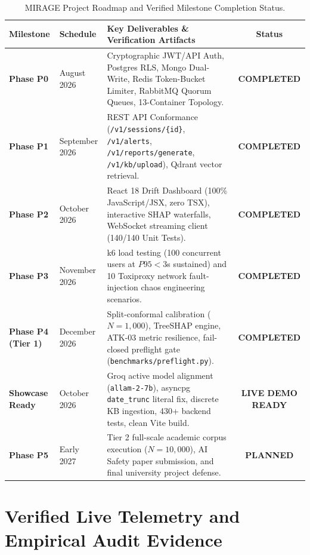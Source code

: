 \documentclass[11pt,a4paper]{article}
\begin{document}
\begin{table}[H]
\centering
\small
\renewcommand{\arraystretch}{1.25}
\begin{tabularx}{\linewidth}{p{2.6cm} p{2.8cm} X c}
\toprule
\textbf{Milestone} & \textbf{Schedule} & \textbf{Key Deliverables \& Verification Artifacts} & \textbf{Status} \\
\midrule
\textbf{Phase P0} & August 2026 & Cryptographic JWT/API Auth, Postgres RLS, Mongo Dual-Write, Redis Token-Bucket Limiter, RabbitMQ Quorum Queues, 13-Container Topology. & \textbf{COMPLETED} \\
\textbf{Phase P1} & September 2026 & REST API Conformance (\texttt{/v1/sessions/\{id\}}, \texttt{/v1/alerts}, \texttt{/v1/reports/generate}, \texttt{/v1/kb/upload}), Qdrant vector retrieval. & \textbf{COMPLETED} \\
\textbf{Phase P2} & October 2026 & React 18 Drift Dashboard (100\% JavaScript/JSX, zero TSX), interactive SHAP waterfalls, WebSocket streaming client (140/140 Unit Tests). & \textbf{COMPLETED} \\
\textbf{Phase P3} & November 2026 & k6 load testing (100 concurrent users at $P95 < 3$s sustained) and 10 Toxiproxy network fault-injection chaos engineering scenarios. & \textbf{COMPLETED} \\
\textbf{Phase P4 (Tier 1)} & December 2026 & Split-conformal calibration ($N=1,000$), TreeSHAP engine, ATK-03 metric resilience, fail-closed preflight gate (\texttt{benchmarks/preflight.py}). & \textbf{COMPLETED} \\
\textbf{Showcase Ready} & October 2026 & Groq active model alignment (\texttt{allam-2-7b}), asyncpg \texttt{date\_trunc} literal fix, discrete KB ingestion, 430+ backend tests, clean Vite build. & \textbf{LIVE DEMO READY} \\
\textbf{Phase P5} & Early 2027 & Tier 2 full-scale academic corpus execution ($N=10,000$), AI Safety paper submission, and final university project defense. & \textbf{PLANNED} \\
\bottomrule
\end{tabularx}
\caption{MIRAGE Project Roadmap and Verified Milestone Completion Status.}
\label{tab:roadmap}
\end{table}

\section{Verified Live Telemetry and Empirical Audit Evidence}
\end{document}
